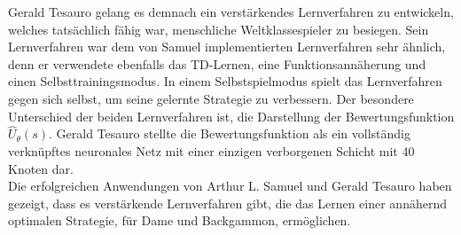 Gerald Tesauro gelang es demnach ein verstärkendes Lernverfahren zu entwickeln, welches tatsächlich fähig war, menschliche Weltklassespieler zu besiegen. Sein Lernverfahren war dem von Samuel implementierten Lernverfahren sehr ähnlich, denn er verwendete ebenfalls das TD-Lernen, eine Funktionsannäherung und einen Selbsttrainingsmodus. In einem Selbstspielmodus spielt das Lernverfahren gegen sich selbst, um seine gelernte Strategie zu verbessern. Der besondere Unterschied der beiden Lernverfahren ist, die Darstellung der Bewertungsfunktion $\hat{U}_\theta(s)$. Gerald Tesauro stellte die Bewertungsfunktion als ein vollständig verknüpftes neuronales Netz mit einer einzigen verborgenen Schicht mit 40 Knoten dar. \\

Die erfolgreichen Anwendungen von Arthur L. Samuel und Gerald Tesauro haben gezeigt, dass es verstärkende Lernverfahren gibt, die das Lernen einer annähernd optimalen Strategie, für Dame und Backgammon, ermöglichen. \\